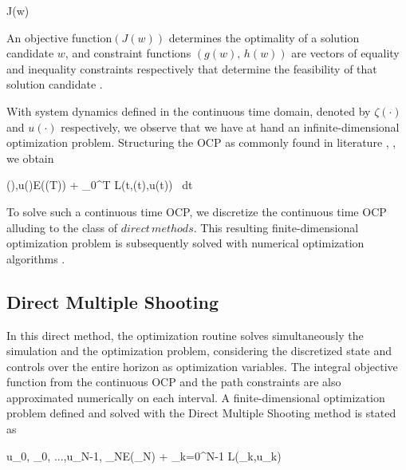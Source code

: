 \begin{mini!}
	{}{J(w)\,}
	{}{}
\end{mini!}
An objective function$(J(w))$ determines the optimality of a solution candidate $w$, and constraint functions $(g(w),\,h(w))$ are vectors of equality and inequality constraints respectively that determine the feasibility of that solution candidate \cite{gros_numerical_2022}.

With system dynamics defined in the continuous time domain, denoted by $\zeta(\cdot)$ and  $u(\cdot)$ respectively, we observe that we have at hand an infinite-dimensional optimization problem. Structuring the \ac{OCP} as commonly found in literature \cite[p. 161]{gros_numerical_2022}, \cite[p. 499]{rawlings_james_model_2020}, we obtain
\begin{mini!}
	{\zeta(\cdot),u(\cdot)}{E(\zeta(T)) + \int_{0}^{T} \! L(t,\zeta(t),u(t)) \, dt \label{eq:ocp_obj} }
	{\label{eq:ocp}}{}
	 \label{EqContinue}
	\label{eq:ocp_eq}
	 \label{eq:ocp_ineq}
\end{mini!}
To solve such a continuous time \ac{OCP}, we discretize the continuous time \ac{OCP} alluding to the class of $direct\,methods$. This resulting finite-dimensional optimization problem is subsequently solved with numerical optimization algorithms \cite[p. 500]{rawlings_james_model_2020}.

\subsection{Direct Multiple Shooting}\label{subsec:direct_multiple_shooting}
In this direct method, the optimization routine solves 
simultaneously the simulation and the optimization problem, considering the discretized state and controls over the entire horizon as optimization variables. The integral objective function from the continuous \ac{OCP} 
and the path constraints are also approximated numerically on each interval. A finite-dimensional optimization problem defined and solved with the Direct Multiple Shooting method is stated as
\begin{mini!}
	{u_{0}, \zeta_{0}, ...,u_{N-1}, \zeta_{N}}{E(\zeta_{N}) + \sum_{k=0}^{N-1} \! L(\zeta_k,u_k)}
	{\label{eq:disc_ocp_form}}{}
\end{mini!}


